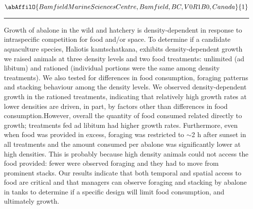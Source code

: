 \begin{center}
   \vspace{2 mm} \begin{center}
    \vspace{2 mm}\begin{center}
  
  $\abAffilO{Bamfield Marine Sciences Centre, Bamfield, BC, V0R 1B0, Canada}{1}$

  \end{center}
  \vspace{2 mm}
  \end{center}\end{center}
  \begin{center}\rule{0.70\linewidth}{0.5 pt}\end{center}

\noindent Growth of abalone in the wild and hatchery is density-dependent in response to intraspecific competition for food and/or space. To determine if a candidate aquaculture species, Haliotis kamtschatkana, exhibits density-dependent growth we raised animals at three density levels and two food treatments: unlimited (ad libitum) and rationed (individual portions were the same among density treatments). We also tested for differences in food consumption, foraging patterns and stacking behaviour among the density levels. We observed density-dependent growth in the rationed treatments, indicating that relatively high growth rates at lower densities are driven, in part, by factors other than differences in food consumption.However, overall the quantity of food consumed related directly to growth; treatments fed ad libitum had higher growth rates. Furthermore, even when food was provided in excess, foraging was restricted to $\sim$2 h after sunset in all treatments and the amount consumed per abalone was significantly lower at high densities. This is probably because high density animals could not access the food provided: fewer were observed foraging and they had to move from prominent stacks. Our results indicate that both temporal and spatial access to food are critical and that managers can observe foraging and stacking by abalone in tanks to determine if a specific design will limit food consumption, and ultimately growth.

